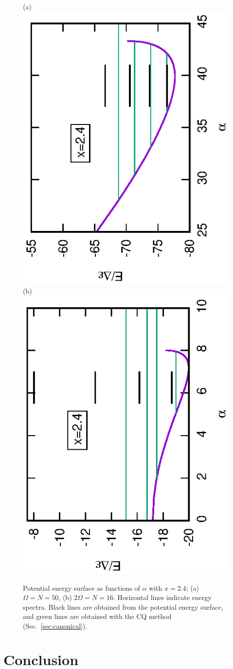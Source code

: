 \documentclass[%
superscriptaddress,
preprint,
showpacs,
nofootinbib,
amsmath,amssymb,
aps,
prc,
floatfix ]%
{revtex4-1}
\begin{document}
\begin{figure}[tb]
 \begin{center}
(a)  \includegraphics[height=0.46\textwidth,angle=-90]{N50Xeq2p4gap_E.eps}
(b)  \includegraphics[height=0.46\textwidth,angle=-90]{N16Xeq2p4gap_E.eps}
 \end{center}
\caption{Potential energy surface as functions of $\alpha$ with $x=2.4$;
(a) $\Omega=N=50$,
(b) $2\Omega=N=16$.
Horizontal lines 
indicate energy spectra. Black lines are obtained
from the potential energy surface, and green lines are 
obtained with the CQ method
(Sec.~\ref{sec:canonical}).
}
 \label{fig:Delta_E}
\end{figure}

\newpage


\section{Conclusion}
\label{sec:conclusion}
\end{document}

